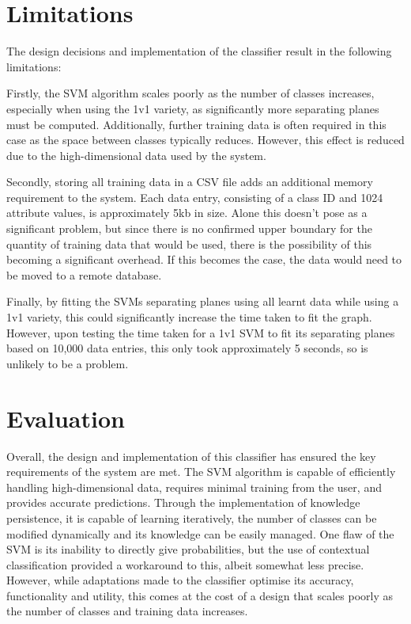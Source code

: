 \section{Limitations}
The design decisions and implementation of the classifier result in the following limitations:

Firstly, the SVM algorithm scales poorly as the number of classes increases, especially when using the 1v1 variety, as significantly more separating planes must be computed. Additionally, further training data is often required in this case as the space between classes typically  reduces. However, this effect is reduced due to the high-dimensional data used by the system. 

Secondly, storing all training data in a CSV file adds an additional memory requirement to the system. Each data entry, consisting of a class ID and 1024 attribute values, is approximately 5kb in size. Alone this doesn’t pose as a significant problem, but since there is no confirmed upper boundary for the quantity of training data that would be used, there is the possibility of this becoming a significant overhead. If this becomes the case, the data would need to be moved to a remote database.

Finally, by fitting the SVMs separating planes using all learnt data while using a 1v1 variety, this could significantly increase the time taken to fit the graph. However, upon testing the time taken for a 1v1 SVM to fit its separating planes based on 10,000 data entries, this only took approximately 5 seconds, so is unlikely to be a problem.

\section{Evaluation}
Overall, the design and implementation of this classifier has ensured the key requirements of the system are met. 
The SVM algorithm is capable of efficiently handling high-dimensional data, requires minimal training from the user, and provides accurate predictions. Through the implementation of knowledge persistence, it is capable of learning iteratively, the number of classes can be modified dynamically and its knowledge can be easily managed.
One flaw of the SVM is its inability to directly give probabilities, but the use of contextual classification provided a workaround to this, albeit somewhat less precise.
However, while adaptations made to the classifier optimise its accuracy, functionality and utility, this comes at the cost of a design that scales poorly as the number of classes and training data increases.
